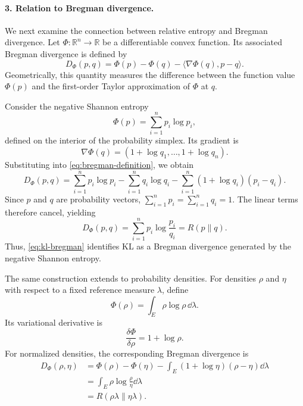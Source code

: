 \documentclass[12pt,a4paper,oneside]{book}
\begin{document}
\begin{solution}
\paragraph{3. Relation to Bregman divergence.}

We next examine the connection between relative entropy and Bregman divergence. Let $\Phi:\mathbb R^n\to\mathbb R$ be a
differentiable convex function. Its associated Bregman divergence is defined by
\begin{equation}
    D_\Phi(p,q) = \Phi(p)-\Phi(q) -\langle\nabla\Phi(q),p-q\rangle.
    \label{eq:bregman-definition}
\end{equation}
Geometrically, this quantity measures the difference between the function value $\Phi(p)$ and the first-order Taylor
approximation of $\Phi$ at $q$.

Consider the negative Shannon entropy
\begin{equation*}
    \Phi(p)=\sum_{i=1}^n p_i\log p_i,
\end{equation*}
defined on the interior of the probability simplex. Its gradient is
\begin{equation*}
    \nabla\Phi(q) = (1+\log q_1,\ldots,1+\log q_n).
\end{equation*}
Substituting into \eqref{eq:bregman-definition}, we obtain
\begin{equation*}
    D_\Phi(p,q) = \sum_{i=1}^n p_i\log p_i - \sum_{i=1}^n q_i\log q_i - \sum_{i=1}^n(1+\log q_i)(p_i-q_i).
\end{equation*}
Since $p$ and $q$ are probability vectors, $\sum_{i=1}^n p_i = \sum_{i=1}^n q_i=1$. The linear terms therefore cancel,
yielding
\begin{equation}
    D_\Phi(p,q) = \sum_{i=1}^n p_i\log\frac{p_i}{q_i} = R(p\|q).
    \label{eq:kl-bregman}
\end{equation}
Thus, \eqref{eq:kl-bregman} identifies KL as a Bregman divergence generated by the negative Shannon entropy.

The same construction extends to probability densities. For densities $\rho$ and $\eta$ with respect to a fixed reference
measure $\lambda$, define
\begin{equation*}
    \Phi(\rho) = \int_E\rho\log\rho\,\dd\lambda.
\end{equation*}
Its variational derivative is
\begin{equation*}
    \frac{\delta\Phi}{\delta\rho} = 1+\log\rho.
\end{equation*}
For normalized densities, the corresponding Bregman divergence is
\begin{equation*}
    \begin{aligned}
        D_\Phi(\rho,\eta)
        &= \Phi(\rho)-\Phi(\eta) - \int_E(1+\log\eta)(\rho-\eta)\dd\lambda\\
        &= \int_E\rho\log\frac{\rho}{\eta}\dd\lambda\\
        &= R(\rho\lambda\|\eta\lambda).
    \end{aligned}
\end{equation*}


\end{solution}
\end{document}
